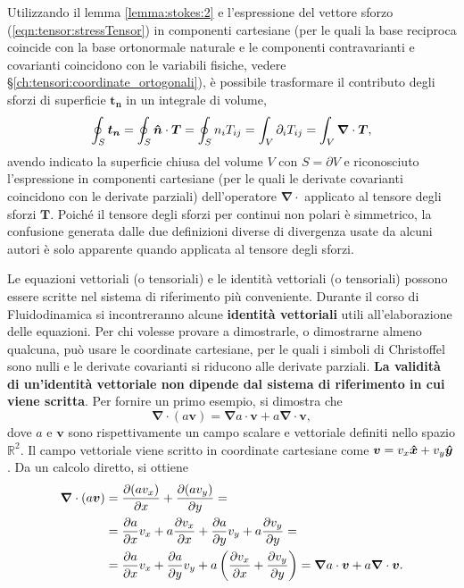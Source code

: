 \begin{remark}
Utilizzando il lemma \ref{lemma:stokes:2} e l'espressione del vettore sforzo (\ref{eqn:tensor:stressTensor}) in componenti cartesiane (per le quali la base reciproca coincide con la base ortonormale naturale e le componenti contravarianti e covarianti coincidono con le variabili fisiche, vedere \S\ref{ch:tensori:coordinate_ortogonali}), è possibile trasformare il contributo degli sforzi di superficie $\bm{t_n}$ in un integrale di volume,
\begin{equation}
  \oint_S \bm{t_n} = \oint_S \bm{\hat{n}} \cdot \bm{T} = \oint_S n_i T_{ij} = \int_V \partial_i T_{ij} = \int_V \bm{\nabla} \cdot \bm{T} ,
\end{equation}
 avendo indicato la superficie chiusa del volume $V$ con $S=\partial V$ e riconosciuto l'espressione in componenti cartesiane (per le quali le derivate covarianti coincidono con le derivate parziali) dell'operatore $\bm{\nabla} \cdot$ applicato al tensore degli sforzi $\bm{T}$. Poiché il tensore degli sforzi per continui non polari è simmetrico, la confusione generata dalle due definizioni diverse di divergenza usate da alcuni autori è solo apparente quando applicata al tensore degli sforzi.
\end{remark}

\noindent
\begin{remark}
    Le equazioni vettoriali (o tensoriali) e le identità vettoriali (o tensoriali) possono essere scritte nel sistema di riferimento più conveniente. Durante il corso di Fluidodinamica si incontreranno alcune \textbf{identità vettoriali} utili all'elaborazione delle equazioni. Per chi volesse provare a dimostrarle, o dimostrarne almeno qualcuna, può usare le coordinate cartesiane, per le quali i simboli di Christoffel sono nulli e le derivate covarianti si riducono alle derivate parziali. \textbf{La validità di un'identità vettoriale non dipende dal sistema di riferimento in cui viene scritta}. Per fornire un primo esempio, si dimostra che
 \begin{equation}
  \bm{\nabla} \cdot (a \bm{v}) = \bm{\nabla} a \cdot \bm{v} + a \bm{\nabla} \cdot \bm{v} ,
 \end{equation}
 dove $a$ e $\bm{v}$ sono rispettivamente un campo scalare e vettoriale definiti nello spazio $\mathbb{R}^2$. Il campo vettoriale viene scritto in coordinate cartesiane come $\bm{v} = v_x \bm{\hat{x}} + v_y \bm{\hat{y}}$. Da un calcolo diretto, si ottiene
 \begin{equation}
 \begin{aligned}
   \bm{\nabla} \cdot (a \bm{v}) & = \dfrac{\partial (a v_x)}{\partial x} + \dfrac{\partial (a v_y)}{\partial y} = \\
    & = \dfrac{\partial a}{\partial x} v_x + a \dfrac{\partial v_x}{\partial x} + \dfrac{\partial a}{\partial y} v_y + a \dfrac{\partial v_y}{\partial y} = \\
    & = \dfrac{\partial a}{\partial x} v_x + \dfrac{\partial a}{\partial y} v_y + a \left(\dfrac{\partial v_x}{\partial x} + \dfrac{\partial v_y}{\partial y} \right) = 
    \bm{\nabla} a \cdot \bm{v} + a \bm{\nabla} \cdot \bm{v} .
 \end{aligned}
 \end{equation}
\end{remark}

